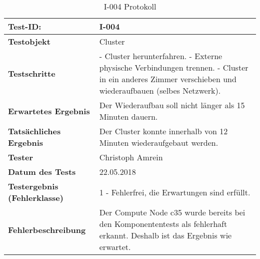 \begin{table}[H]
\centering
\begin{tabular}{p{4.5cm}p{11.5cm}}
\hline
\cellcolor{heading}\textbf{Test-ID:} & \textbf{I-004} \\\hline
\cellcolor{heading}\textbf{Testobjekt} & Cluster \\\hline
\cellcolor{heading}\textbf{Testschritte} & 
- Cluster herunterfahren.\newline
- Externe physische Verbindungen trennen.\newline
- Cluster in ein anderes Zimmer verschieben und wiederaufbauen (selbes Netzwerk). \\\hline
\cellcolor{heading}\textbf{Erwartetes Ergebnis} & Der Wiederaufbau soll nicht länger als 15 Minuten dauern. \\\hline
\cellcolor{heading}\textbf{Tatsächliches Ergebnis} &
Der Cluster konnte innerhalb von 12 Minuten wiederaufgebaut werden. \\\hline
\cellcolor{heading}\textbf{Tester} & Christoph Amrein  \\\hline
\cellcolor{heading}\textbf{Datum des Tests} & 22.05.2018  \\\hline
\cellcolor{heading}\textbf{Testergebnis \newline (Fehlerklasse)} & 1 - Fehlerfrei, die Erwartungen sind erfüllt. \\\hline
\cellcolor{heading}\textbf{Fehlerbeschreibung} & Der Compute Node c35 wurde bereits bei den Komponententests als fehlerhaft erkannt. Deshalb ist das Ergebnis wie erwartet.  \\\hline
\end{tabular}
\caption{I-004 Protokoll}
\end{table}
\newpage
